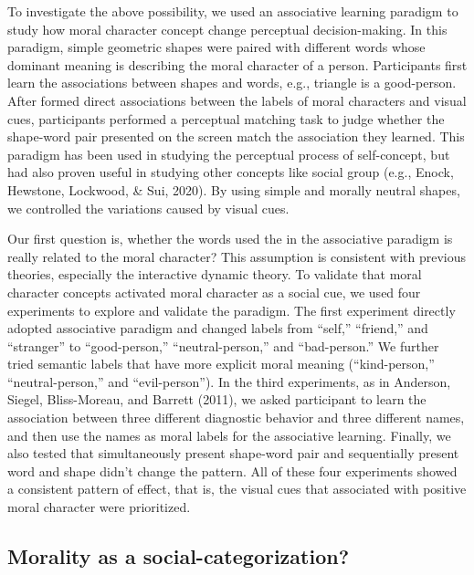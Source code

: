 \documentclass[
  english,
  man]{apa6}
\begin{document}
To investigate the above possibility, we used an associative learning paradigm to study how moral character concept change perceptual decision-making. In this paradigm, simple geometric shapes were paired with different words whose dominant meaning is describing the moral character of a person. Participants first learn the associations between shapes and words, e.g., triangle is a good-person. After formed direct associations between the labels of moral characters and visual cues, participants performed a perceptual matching task to judge whether the shape-word pair presented on the screen match the association they learned. This paradigm has been used in studying the perceptual process of self-concept, but had also proven useful in studying other concepts like social group (e.g., Enock, Hewstone, Lockwood, \& Sui, 2020). By using simple and morally neutral shapes, we controlled the variations caused by visual cues.

Our first question is, whether the words used the in the associative paradigm is really related to the moral character? This assumption is consistent with previous theories, especially the interactive dynamic theory. To validate that moral character concepts activated moral character as a social cue, we used four experiments to explore and validate the paradigm. The first experiment directly adopted associative paradigm and changed labels from ``self,'' ``friend,'' and ``stranger'' to ``good-person,'' ``neutral-person,'' and ``bad-person.'' We further tried semantic labels that have more explicit moral meaning (``kind-person,'' ``neutral-person,'' and ``evil-person''). In the third experiments, as in Anderson, Siegel, Bliss-Moreau, and Barrett (2011), we asked participant to learn the association between three different diagnostic behavior and three different names, and then use the names as moral labels for the associative learning. Finally, we also tested that simultaneously present shape-word pair and sequentially present word and shape didn't change the pattern. All of these four experiments showed a consistent pattern of effect, that is, the visual cues that associated with positive moral character were prioritized.

\hypertarget{morality-as-a-social-categorization}{%
\subsection{Morality as a social-categorization?}\label{morality-as-a-social-categorization}}
\end{document}
